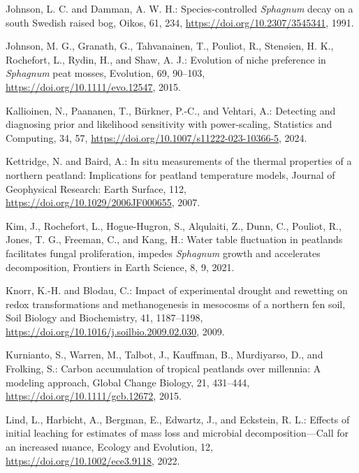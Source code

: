 \documentclass[
  12pt,
]{article}
\newlength{\cslhangindent}
\newlength{\cslentryspacingunit} %
\newenvironment{CSLReferences}[2] %
 {%
  \setlength{\parindent}{0pt}
  \ifodd #1
  \let\oldpar\par
  \def\par{\hangindent=\cslhangindent\oldpar}
  \fi
  \setlength{\parskip}{#2\cslentryspacingunit}
 }%
 {}
\begin{document}
\begin{CSLReferences}{0}{0}
\leavevmode{}%
Johnson, L. C. and Damman, A. W. H.: Species-controlled {\emph{Sphagnum}} decay on a south {Swedish} raised bog, Oikos, 61, 234, \url{https://doi.org/10.2307/3545341}, 1991.

\leavevmode{}%
Johnson, M. G., Granath, G., Tahvanainen, T., Pouliot, R., Stenøien, H. K., Rochefort, L., Rydin, H., and Shaw, A. J.: Evolution of niche preference in {\emph{Sphagnum}} peat mosses, Evolution, 69, 90--103, \url{https://doi.org/10.1111/evo.12547}, 2015.

\leavevmode{}%
Kallioinen, N., Paananen, T., Bürkner, P.-C., and Vehtari, A.: Detecting and diagnosing prior and likelihood sensitivity with power-scaling, Statistics and Computing, 34, 57, \url{https://doi.org/10.1007/s11222-023-10366-5}, 2024.

\leavevmode{}%
Kettridge, N. and Baird, A.: In situ measurements of the thermal properties of a northern peatland: {Implications} for peatland temperature models, Journal of Geophysical Research: Earth Surface, 112, \url{https://doi.org/10.1029/2006JF000655}, 2007.

\leavevmode{}%
Kim, J., Rochefort, L., Hogue-Hugron, S., Alqulaiti, Z., Dunn, C., Pouliot, R., Jones, T. G., Freeman, C., and Kang, H.: Water table fluctuation in peatlands facilitates fungal proliferation, impedes {\emph{Sphagnum}} growth and accelerates decomposition, Frontiers in Earth Science, 8, 9, 2021.

\leavevmode{}%
Knorr, K.-H. and Blodau, C.: Impact of experimental drought and rewetting on redox transformations and methanogenesis in mesocosms of a northern fen soil, Soil Biology and Biochemistry, 41, 1187--1198, \url{https://doi.org/10.1016/j.soilbio.2009.02.030}, 2009.

\leavevmode{}%
Kurnianto, S., Warren, M., Talbot, J., Kauffman, B., Murdiyarso, D., and Frolking, S.: Carbon accumulation of tropical peatlands over millennia: A modeling approach, Global Change Biology, 21, 431--444, \url{https://doi.org/10.1111/gcb.12672}, 2015.

\leavevmode{}%
Lind, L., Harbicht, A., Bergman, E., Edwartz, J., and Eckstein, R. L.: Effects of initial leaching for estimates of mass loss and microbial decomposition---{Call} for an increased nuance, Ecology and Evolution, 12, \url{https://doi.org/10.1002/ece3.9118}, 2022.


\end{CSLReferences}
\end{document}
